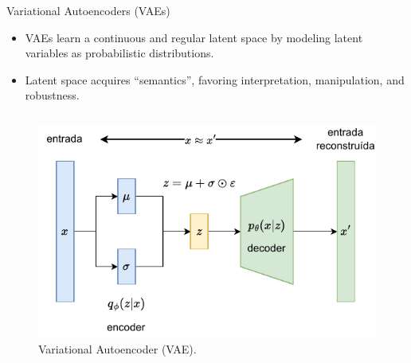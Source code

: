 \documentclass[aspectratio=169,xcolor=dvipsnames]{beamer}
\begin{document}


\begin{frame}{Variational Autoencoders (VAEs)}
    \begin{itemize}
        \item VAEs learn a \alert{continuous} and \alert{regular} latent space by modeling latent variables as probabilistic distributions.
        \item Latent space acquires ``semantics'', favoring interpretation, manipulation, and robustness.
    \end{itemize}
    \vspace{-1em}
    \begin{columns}[t]
        \begin{figure}
            \centering
            \includegraphics[width=0.8\linewidth]{imgs/vae.pdf}
            \caption{Variational Autoencoder (VAE).}
        \end{figure}


\end{columns}
\end{frame}
\end{document}
